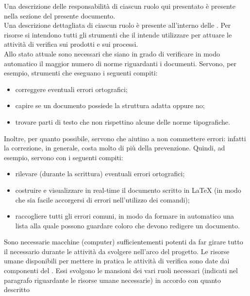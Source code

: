 					Una descrizione delle responsabilità di ciascun ruolo qui presentato è presente nella sezione  del presente documento.\\
					Una descrizione dettagliata di ciascun ruolo è presente all'interno delle .
					Per risorse  si intendono tutti gli strumenti  che il  intende utilizzare per attuare le attività di verifica sui 
					prodotti e sui processi.\\
					Allo stato attuale sono necessari  che siano in grado di verificare in modo automatico il maggior numero di norme riguardanti 
					i documenti. Servono, per esempio, strumenti che eseguano i seguenti compiti:
					\begin{itemize}
						\item correggere eventuali errori ortografici;
						\item capire se un documento possiede la struttura adatta oppure no;
						\item trovare parti di testo che non rispettino alcune delle norme tipografiche.
					\end{itemize}
					Inoltre, per quanto possibile, servono  che aiutino a non commettere errori: infatti la correzione, in generale, costa 
					molto di più della prevenzione. Quindi, ad esempio, servono  con i seguenti compiti:
					\begin{itemize}
						\item rilevare (durante la scrittura) eventuali errori ortografici;
						\item costruire e visualizzare in real-time il documento scritto in \LaTeX{} (in modo che sia facile accorgersi di errori 
						nell'utilizzo dei comandi);
						\item raccogliere tutti gli errori comuni, in modo da formare in automatico una lista alla quale possono guardare coloro che 
						devono redigere un documento. 
					\end{itemize}
					Sono necessarie macchine (computer) sufficientementi potenti da far girare tutto il  necessario durante le attività da
					svolgere nell'arco del progetto.
					Le risorse umane disponibili per mettere in pratica le attività di verifica sono date dai componenti del . Essi svolgono le 
					mansioni dei vari ruoli necessari (indicati nel paragrafo riguardante le risorse umane necessarie) in accordo con quanto descritto 
